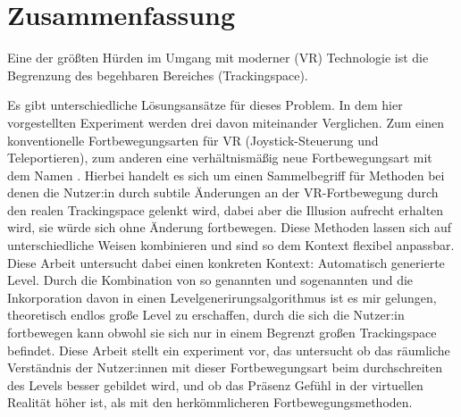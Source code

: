 \chapter*{Zusammenfassung}
Eine der größten Hürden im Umgang mit moderner  (VR) Technologie ist die Begrenzung des begehbaren Bereiches (Trackingspace).


Es gibt unterschiedliche Lösungsansätze für dieses Problem. In dem hier vorgestellten Experiment werden drei davon miteinander Verglichen. Zum einen konventionelle Fortbewegungsarten für VR (Joystick-Steuerung und Teleportieren), zum anderen eine verhältnismäßig neue Fortbewegungsart mit dem Namen . Hierbei handelt es sich um einen Sammelbegriff für Methoden bei denen die Nutzer:in durch subtile Änderungen an der VR-Fortbewegung durch den realen Trackingspace gelenkt wird, dabei aber die Illusion aufrecht erhalten wird, sie würde sich ohne Änderung fortbewegen. Diese Methoden lassen sich auf unterschiedliche Weisen kombinieren und sind so dem Kontext flexibel anpassbar. Diese Arbeit untersucht dabei einen konkreten Kontext: Automatisch generierte Level. Durch die Kombination von so genannten  und sogenannten  und die Inkorporation davon in einen Levelgenerirungsalgorithmus ist es mir gelungen, theoretisch endlos große Level zu erschaffen, durch die sich die Nutzer:in fortbewegen kann obwohl sie sich nur in einem Begrenzt großen Trackingspace befindet. Diese Arbeit stellt ein experiment vor, das untersucht ob das räumliche Verständnis der Nutzer:innen mit dieser Fortbewegungsart beim durchschreiten des Levels besser gebildet wird, und ob das Präsenz Gefühl in der virtuellen Realität höher ist, als mit den herkömmlicheren Fortbewegungsmethoden.



